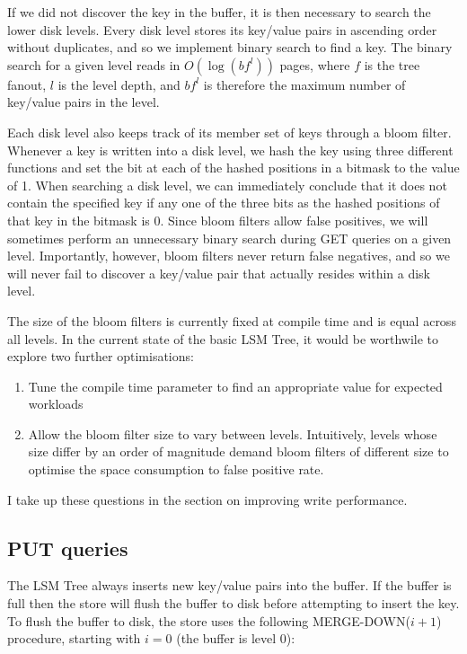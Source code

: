 \documentclass{acm}
\begin{document}
If we did not discover the key in the buffer, it is then necessary to search the lower disk levels. Every disk level stores its key/value pairs in ascending order without duplicates, and so we implement binary search to find a key. The binary search for a given level reads in $O(\log(bf^l))$ pages, where $f$ is the tree fanout, $l$ is the level depth, and $bf^l$ is therefore the maximum number of key/value pairs in the level.

Each disk level also keeps track of its member set of keys through a bloom filter. Whenever a key is written into a disk level, we hash the key using three different functions and set the bit at each of the hashed positions in a bitmask to the value of 1. When searching a disk level, we can immediately conclude that it does not contain the specified key if any one of the three bits as the hashed positions of that key in the bitmask is 0. Since bloom filters allow false positives, we will sometimes perform an unnecessary binary search during GET queries on a given level. Importantly, however, bloom filters never return false negatives, and so we will never fail to discover a key/value pair that actually resides within a disk level.

The size of the bloom filters is currently fixed at compile time and is equal across all levels. In the current state of the basic LSM Tree, it would be worthwile to explore two further optimisations:

\begin{enumerate}
  \item Tune the compile time parameter to find an appropriate value for expected workloads
  \item Allow the bloom filter size to vary between levels. Intuitively, levels whose size differ by an order of magnitude demand bloom filters of different size to optimise the space consumption to false positive rate.
\end{enumerate}

I take up these questions in the section on improving write performance.

\subsection{PUT queries}

The LSM Tree always inserts new key/value pairs into the buffer. If the buffer is full then the store will flush the buffer to disk before attempting to insert the key. To flush the buffer to disk, the store uses the following MERGE-DOWN($i+1$) procedure, starting with $i=0$ (the buffer is level 0):
\end{document}
